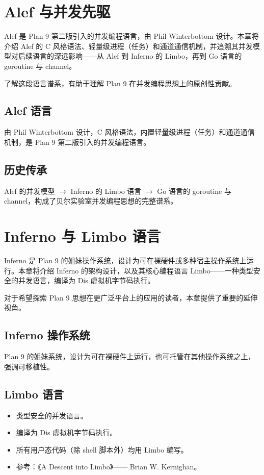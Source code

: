 \documentclass[12pt,UTF8]{ctexbook}
\begin{document}
\chapter{Alef 与并发先驱}

Alef 是 Plan 9 第二版引入的并发编程语言，由 Phil Winterbottom 设计。本章将介绍 Alef 的 C 风格语法、轻量级进程（任务）和通道通信机制，并追溯其并发模型对后续语言的深远影响——从 Alef 到 Inferno 的 Limbo，再到 Go 语言的 goroutine 与 channel。

了解这段语言谱系，有助于理解 Plan 9 在并发编程思想上的原创性贡献。

\section{Alef 语言}

由 Phil Winterbottom 设计，C 风格语法，内置轻量级进程（任务）和通道通信机制，是 Plan 9 第二版引入的并发编程语言。

\section{历史传承}

Alef 的并发模型 $\to$ Inferno 的 Limbo 语言 $\to$ Go 语言的 goroutine 与 channel，构成了贝尔实验室并发编程思想的完整谱系。

\chapter{Inferno 与 Limbo 语言}

Inferno 是 Plan 9 的姐妹操作系统，设计为可在裸硬件或多种宿主操作系统上运行。本章将介绍 Inferno 的架构设计，以及其核心编程语言 Limbo——一种类型安全的并发语言，编译为 Dis 虚拟机字节码执行。

对于希望探索 Plan 9 思想在更广泛平台上的应用的读者，本章提供了重要的延伸视角。

\section{Inferno 操作系统}
Plan 9 的姐妹系统，设计为可在裸硬件上运行，也可托管在其他操作系统之上，强调可移植性。

\section{Limbo 语言}

\begin{itemize}
\item 类型安全的并发语言。
\item 编译为 Dis 虚拟机字节码执行。
\item 所有用户态代码（除 shell 脚本外）均用 Limbo 编写。
\item 参考：《A Descent into Limbo》—— Brian W. Kernighan。
\end{itemize}
\end{document}
